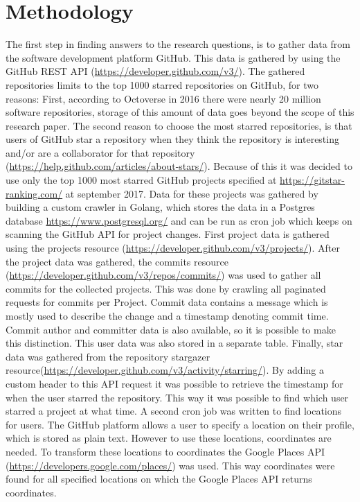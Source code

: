 \documentclass[acmtog, authorversion]{acmart}
\begin{document}
\section{Methodology}
The first step in finding answers to the research questions, is to gather data from the software development platform GitHub. 
This data is gathered by using the GitHub REST API (\url{https://developer.github.com/v3/}). 
The gathered repositories limits to the top 1000 starred repositories on GitHub, for two reasons:
First, according to Octoverse \cite{GHOctoverse} in 2016 there were nearly 20 million software repositories, storage of this amount of data goes beyond the scope of this research paper.
The second reason to choose the most starred repositories, is that users of GitHub star a repository when they think the repository is interesting and/or are a collaborator for that repository (\url{https://help.github.com/articles/about-stars/}). 
Because of this it was decided to use only the top 1000 most starred GitHub projects specified at \url{https://gitstar-ranking.com/} at september 2017. 
Data for these projects was gathered by building a custom crawler in Golang, which stores the data in a Postgres database \url{https://www.postgresql.org/} and can be run as cron job which keeps on scanning the GitHub API for project changes.
First project data is gathered using the projects resource (\url{https://developer.github.com/v3/projects/}).
After the project data was gathered, the commits resource (\url{https://developer.github.com/v3/repos/commits/}) was used to gather all commits for the collected projects. 
This was done by crawling all paginated requests for commits per Project. 
Commit data contains a message which is mostly used to describe the change and a timestamp denoting commit time.
Commit author and committer data is also available, so it is possible to make this distinction.
This user data was also stored in a separate table.
Finally, star data was gathered from the repository stargazer resource(\url{https://developer.github.com/v3/activity/starring/}).
By adding a custom header to this API request it was possible to retrieve the timestamp for when the user starred the repository.
This way it was possible to find which user starred a project at what time.
A second cron job was written to find locations for users. 
The GitHub platform allows a user to specify a location on their profile, which is stored as plain text. 
However to use these locations, coordinates are needed. 
To transform these locations to coordinates the Google Places API (\url{https://developers.google.com/places/}) was used. 
This way coordinates were found for all specified locations on which the Google Places API returns coordinates.
\end{document}
